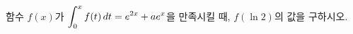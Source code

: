 \hspace*{2mm}\begin{minipage}[t]{\dimexpr\linewidth-2mm\relax}\vspace{0pt}
함수 $f(x)$가 $\displaystyle\int_{0}^{x}f(t)\mkern3mu dt=e^{2x}+ae^x$을 만족시킬 때, $f(\ln 2)$의 값을 구하시오. \end{minipage}
